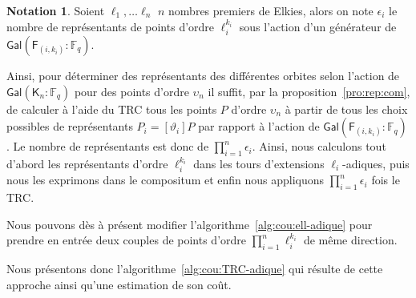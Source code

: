 \documentclass[10pt,a4paper]{book}
\theoremstyle{plain}
\theoremstyle{definition}
\theoremstyle{definition}
\theoremstyle{definition}
\theoremstyle{definition}
\theoremstyle{definition}
\theoremstyle{remark}
\theoremstyle{remark}
\theoremstyle{definition}
\newtheorem{nota}[thm]{Notation}
\begin{document}
\begin{nota}
Soient $\ell_1, \dots \ell_n$ $n$ nombres premiers de Elkies, alors on note 
$\epsilon_i$ le nombre de représentants de points d'ordre $\ell_i^{k_i}$ sous 
l'action d'un générateur de $\mathsf{Gal}(\mathsf{F}_{(i,k_i)}:\mathbb{F}_q)$.
\end{nota}

Ainsi, pour déterminer des représentants des différentes orbites selon l'action
de $\mathsf{Gal}(\mathsf{K}_{n}:\mathbb{F}_q)$ pour des points d'ordre $\upsilon_n$ il suffit, par la 
proposition~\ref{pro:rep:com}, de calculer à l'aide du TRC tous les points $P$ 
d'ordre $\upsilon_n$ à partir de tous les choix possibles de représentants 
$P_i=[\vartheta_i]P$ par rapport à l'action de $\mathsf{Gal}(\mathsf{F}_{(i,k_i)}:\mathbb{F}_q)$.
Le nombre de représentants est donc de $\prod_{i=1}^{n} \epsilon_i$. Ainsi, nous 
calculons tout d'abord les représentants d'ordre $\ell_i^{k_i}$ dans les tours 
d'extensions $\ell_i$-adiques, puis nous les exprimons dans le compositum et 
enfin nous appliquons $\prod_{i=1}^{n} \epsilon_i$ fois le TRC. 
  
Nous pouvons dès à présent modifier l'algorithme~\ref{alg:cou:ell-adique} pour 
prendre en entrée deux couples de points d'ordre $\prod_{i=1}^n\ell_i^{k_i}$ de
même direction.
 
Nous présentons donc l'algorithme~\ref{alg:cou:TRC-adique} qui résulte de cette
approche ainsi qu'une estimation de son coût.
 
\end{document}
